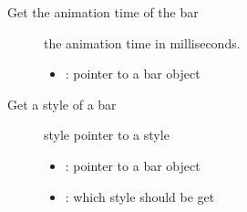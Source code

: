 \documentclass[letterpaper,10pt,english]{sphinxmanual}
\begin{document}

\begin{fulllineitems}
\label{\detokenize{object-types/bar:_CPPv420lv_bar_get_anim_timeP8lv_obj_t8uint16_t}}%
\pysigstartmultiline
{}\label{\detokenize{object-types/bar:lv__bar_8h_1a2194394677ad3ef24beb6cd9d57d9bf0}}%
\pysigstopmultiline
Get the animation time of the bar \begin{description}
\item[{}] \leavevmode
the animation time in milliseconds. 

\item[{}] \leavevmode\begin{itemize}
\item {} 
: pointer to a bar object 

\end{itemize}

\end{description}


\end{fulllineitems}


\begin{fulllineitems}
\label{\detokenize{object-types/bar:_CPPv416lv_bar_get_stylePK8lv_obj_t14lv_bar_style_t}}%
\pysigstartmultiline
{}\label{\detokenize{object-types/bar:lv__bar_8h_1a81683a7af915a17bb41057f5b70174c7}}%
\pysigstopmultiline
Get a style of a bar \begin{description}
\item[{}] \leavevmode
style pointer to a style 

\item[{}] \leavevmode\begin{itemize}
\item {} 
: pointer to a bar object 

\item {} 
: which style should be get 

\end{itemize}

\end{description}


\end{fulllineitems}
\end{document}

